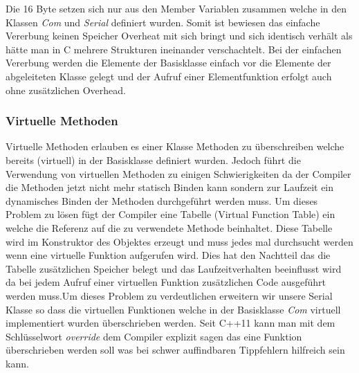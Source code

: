 \documentclass[MES,Master,ngerman]{twbook}%
\begin{document}
Die 16 Byte setzen sich nur aus den Member Variablen zusammen welche in den Klassen \textit{Com} und \textit{Serial} definiert wurden. Somit ist bewiesen das einfache Vererbung keinen Speicher Overheat mit sich bringt und sich identisch verhält als hätte man in C mehrere Strukturen ineinander verschachtelt. Bei der einfachen Vererbung werden die Elemente der Basisklasse einfach vor die Elemente der abgeleiteten Klasse gelegt und der Aufruf einer Elementfunktion erfolgt auch ohne zusätzlichen Overhead.   \newpage


\subsubsection{Virtuelle Methoden}
Virtuelle Methoden erlauben es einer Klasse Methoden zu überschreiben welche bereits (virtuell) in der Basisklasse definiert wurden. Jedoch führt die Verwendung von virtuellen Methoden zu einigen Schwierigkeiten da der Compiler die Methoden jetzt nicht mehr statisch Binden kann sondern zur Laufzeit ein dynamisches Binden der Methoden durchgeführt werden muss. Um dieses Problem zu lösen fügt der Compiler eine Tabelle (Virtual Function Table) ein welche die Referenz auf die zu verwendete Methode beinhaltet. Diese Tabelle wird im Konstruktor des Objektes erzeugt und muss jedes mal durchsucht werden wenn eine virtuelle Funktion aufgerufen wird. Dies hat den Nachtteil das die Tabelle zusätzlichen Speicher belegt und das Laufzeitverhalten beeinflusst wird da bei jedem Aufruf einer virtuellen Funktion zusätzlichen Code ausgeführt werden muss.\newline Um dieses Problem zu verdeutlichen erweitern wir unsere Serial Klasse so dass die virtuellen Funktionen welche in der Basisklasse \textit{Com} virtuell implementiert wurden überschrieben werden. Seit C++11 kann man mit dem Schlüsselwort \textit{override} dem Compiler explizit sagen das eine Funktion überschrieben werden soll was bei schwer auffindbaren Tippfehlern hilfreich sein kann.

\begin{figure}[!htb]
	\begin{subfigure}[b]{0.5\textwidth}
		
		\label{fig:33}
	\end{subfigure}
	\begin{subfigure}[b]{0.5\textwidth}
		
		\label{fig:34}
	\end{subfigure}
\end{figure}
\newpage
\end{document}
